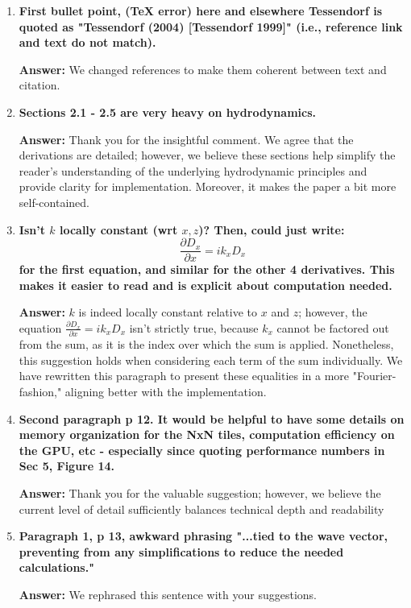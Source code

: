 \documentclass{article}
\newcommand{\answer}[1]{\textbf{\textcolor{answercolor}{Answer:}} \textcolor{answercolor}{#1}}
\begin{document}
\begin{enumerate}[label=\textbf{\arabic*.}]
	\item \textbf{First bullet point, (TeX error) here and elsewhere Tessendorf is quoted as "Tessendorf (2004) [Tessendorf 1999]" (i.e., reference link and text do not match).}

	      \answer{We changed references to make them coherent between text and citation.}

	\item \textbf{Sections 2.1 - 2.5 are very heavy on hydrodynamics.}

	      \answer{Thank you for the insightful comment. We agree that the derivations are detailed; however, we believe these sections help simplify the reader's understanding of the underlying hydrodynamic principles and provide clarity for implementation. Moreover, it makes the paper a bit more self-contained.}

	\item \textbf{Isn't $k$ locally constant (wrt $x,z$)? Then, could just write:}
	      \[
		      \frac{\partial D_x}{\partial x} = i k_x D_x
	      \]
	      \textbf{for the first equation, and similar for the other 4 derivatives. This makes it easier to read and is explicit about computation needed.}

	      \answer{$k$ is indeed locally constant relative to $x$ and $z$; however, the equation $\frac{\partial D_x}{\partial x} = i k_x D_x$ isn't strictly true, because $k_x$ cannot be factored out from the sum, as it is the index over which the sum is applied. Nonetheless, this suggestion holds when considering each term of the sum individually. We have rewritten this paragraph to present these equalities in a more "Fourier-fashion," aligning better with the implementation.}

	\item \textbf{Second paragraph p 12. It would be helpful to have some details on memory organization for the NxN tiles, computation efficiency on the GPU, etc - especially since quoting performance numbers in Sec 5, Figure 14.}

	      \answer{Thank you for the valuable suggestion; however, we believe the current level of detail sufficiently balances technical depth and readability}

	\item \textbf{Paragraph 1, p 13, awkward phrasing "...tied to the wave vector, preventing from any simplifications to reduce the needed calculations."}

	      \answer{We rephrased this sentence with your suggestions.}


\end{enumerate}
\end{document}
